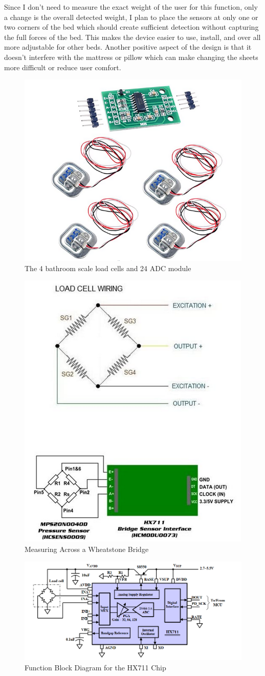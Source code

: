 \documentclass[11pt]{article}
\begin{document}
Since I don't need to measure the exact weight of the user for this function, only a change is the overall detected weight, I plan to place the sensors at only one or two corners of the bed which should create sufficient detection without capturing the full forces of the bed. 
This makes the device easier to use, install, and over all more adjustable for other beds. 
Another positive aspect of the design is that it doesn't interfere with the mattress or pillow which can make changing the sheets more difficult or reduce user comfort.\\
\begin{figure}[H]
	\centering
	\includegraphics[width = 0.5\linewidth]{Half-bridge-Gagues}
	\caption{The 4 bathroom scale load cells and 24 ADC module}
	\label{fig:loadcellproduct}
\end{figure}
\begin{figure}[H]
	\centering
	\includegraphics[width = 0.4\linewidth]{bridgeConnefiguration}
	\caption{Measuring Across a Wheatstone Bridge}
	\label{fig:Bridge}
\end{figure}
\begin{figure}[H]
	\centering
	\includegraphics[width = 0.7\linewidth]{hx711applicationBlock}
	\caption{Function Block Diagram for the HX711 Chip}
	\label{fig:hx711blocks}
\end{figure}
\end{document}

